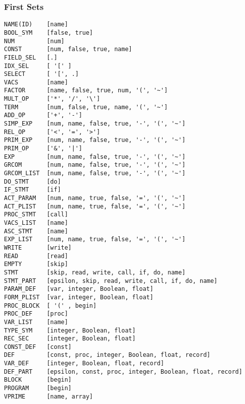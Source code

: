 \documentclass{article}
\begin{document}
\subsubsection{First Sets}

\begin{verbatim}
NAME(ID)    [name]
BOOL_SYM    [false, true]
NUM         [num]
CONST       [num, false, true, name]
FIELD_SEL   [.]
IDX_SEL     [ '[' ]
SELECT      [ '[', .]
VACS        [name]
FACTOR      [name, false, true, num, '(', '~']
MULT_OP     ['*', '/', '\']
TERM        [num, false, true, name, '(', '~']
ADD_OP      ['+', '-']
SIMP_EXP    [num, name, false, true, '-', '(', '~']
REL_OP      ['<', '=', '>']
PRIM_EXP    [num, name, false, true, '-', '(', '~']
PRIM_OP     ['&', '|']
EXP         [num, name, false, true, '-', '(', '~']
GRCOM       [num, name, false, true, '-', '(', '~']
GRCOM_LIST  [num, name, false, true, '-', '(', '~']
DO_STMT     [do]
IF_STMT     [if]
ACT_PARAM   [num, name, true, false, '=', '(', '~']
ACT_PLIST   [num, name, true, false, '=', '(', '~']
PROC_STMT   [call]
VACS_LIST   [name]
ASC_STMT    [name]
EXP_LIST    [num, name, true, false, '=', '(', '~']
WRITE       [write]
READ        [read]
EMPTY       [skip]
STMT        [skip, read, write, call, if, do, name]
STMT_PART   [epsilon, skip, read, write, call, if, do, name]
PARAM_DEF   [var, integer, Boolean, float]
FORM_PLIST  [var, integer, Boolean, float]
PROC_BLOCK  [ '(' , begin]
PROC_DEF    [proc]
VAR_LIST    [name]
TYPE_SYM    [integer, Boolean, float]
REC_SEC     [integer, Boolean, float]
CONST_DEF   [const]
DEF         [const, proc, integer, Boolean, float, record]
VAR_DEF     [integer, Boolean, float, record]
DEF_PART    [epsilon, const, proc, integer, Boolean, float, record]
BLOCK       [begin]
PROGRAM     [begin]
VPRIME      [name, array]
\end{verbatim}
\end{document}
